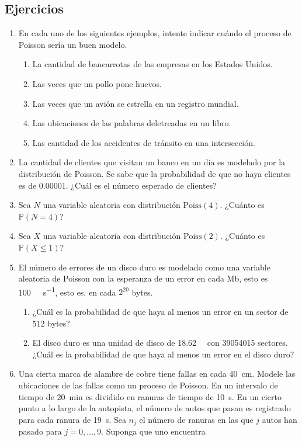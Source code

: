 \subsection{Ejercicios}

\begin{enumerate}
	\item En cada uno de los siguientes ejemplos, intente indicar cuándo el proceso de Poisson sería un buen modelo.
	\begin{enumerate}
		\item La cantidad de bancarrotas de las empresas en los Estados Unidos.
		\item Las  veces que un pollo pone huevos.
		\item Las veces que un avión se estrella en un registro mundial.
		\item Las ubicaciones de las palabras deletreadas en un libro.
		\item Las cantidad de los accidentes de tránsito en una intersección.
	\end{enumerate}
	\item La cantidad de clientes que visitan un banco en un día es modelado por la distribución de Poisson. Se sabe que la probabilidad de que no haya clientes es de $0.00001$. ¿Cuál es el número esperado de clientes?
	\item Sea $N$ una variable aleatoria con distribución $\mathrm{Poiss}(4)$. ¿Cuánto es $\mathds{P}\left(N=4\right)$?
	\item Sea $X$ una variable aleatoria con distribución $\mathrm{Poiss}(2)$. ¿Cuánto es $\mathds{P}\left(X\le1\right)$?
	\item El número de errores de un disco duro es modelado como una variable aleatoria de Poisson con la esperanza de un error en cada Mb, esto es
          \SI{100}{\mega\byte\per\second}, esto es, en cada $2^{20}$ bytes.
          \begin{enumerate}
          \item ¿Cuál es la probabilidad de que haya al menos un error en un sector de $512$ bytes?
          \item El disco duro es una unidad de disco de \SI{18.62}{\giga\byte} con \num{39054015} sectores. ¿Cuál es la probabilidad de que haya al menos un error en el disco duro?
          \end{enumerate}
        \item Una cierta marca de alambre de cobre tiene fallas en cada \SI{40}{\centi\metre}. Modele las  ubicaciones de las fallas como un proceso de Poisson. En un intervalo de tiempo de \SI{20}{\minute} es dividido en ranuras de tiempo de \SI{10}{\second}. En un cierto punto a lo largo de la autopista, el número de autos que pasan es registrado para cada ranura de \SI{19}{\second}. Sea $n_j$ el número de ranuras en las que $j$ autos han pasado para $j=0,\ldots,9$. Suponga que uno encuentra

\end{enumerate}
